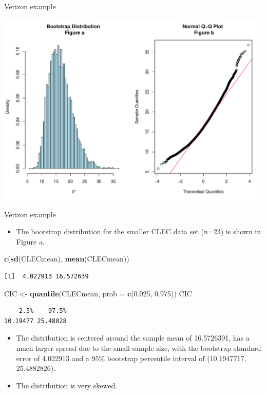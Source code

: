 \documentclass[
  ignorenonframetext,
]{beamer}
\newenvironment{Shaded}{\begin{snugshade}}{\end{snugshade}}
\newcommand{\AttributeTok}[1]{\textcolor[rgb]{0.13,0.29,0.53}{#1}}
\newcommand{\FloatTok}[1]{\textcolor[rgb]{0.00,0.00,0.81}{#1}}
\newcommand{\FunctionTok}[1]{\textcolor[rgb]{0.13,0.29,0.53}{\textbf{#1}}}
\newcommand{\NormalTok}[1]{#1}
\newcommand{\OtherTok}[1]{\textcolor[rgb]{0.56,0.35,0.01}{#1}}
\providecommand{\tightlist}{%
  \setlength{\itemsep}{0pt}\setlength{\parskip}{0pt}}
\begin{document}
\begin{frame}[fragile]{Verizon example}
\begin{center}\includegraphics[width=0.6\linewidth,height=0.35\textheight]{Week10A_files/figure-beamer/unnamed-chunk-35-1} \end{center}
\normalsize
\end{frame}

\begin{frame}[fragile]{Verizon example}
\protect\hypertarget{verizon-example-5}{}
\begin{itemize}
\tightlist
\item
  The bootstrap distribution for the smaller CLEC data set (n=23) is
  shown in Figure a.
\end{itemize}

\small

\begin{Shaded}
\begin{Highlighting}[]
\FunctionTok{c}\NormalTok{(}\FunctionTok{sd}\NormalTok{(CLECmean), }\FunctionTok{mean}\NormalTok{(CLECmean))}
\end{Highlighting}
\end{Shaded}

\begin{verbatim}
[1]  4.022913 16.572639
\end{verbatim}

\begin{Shaded}
\begin{Highlighting}[]
\NormalTok{CIC }\OtherTok{\textless{}{-}} \FunctionTok{quantile}\NormalTok{(CLECmean, }\AttributeTok{prob =} \FunctionTok{c}\NormalTok{(}\FloatTok{0.025}\NormalTok{, }\FloatTok{0.975}\NormalTok{))}
\NormalTok{CIC}
\end{Highlighting}
\end{Shaded}

\begin{verbatim}
    2.5%    97.5% 
10.19477 25.48828 
\end{verbatim}

\normalsize

\begin{itemize}
\tightlist
\item
  The distribution is centered around the sample mean of 16.5726391, has
  a much larger spread due to the small sample size, with the bootstrap
  standard error of 4.022913 and a \(95\%\) bootstrap percentile
  interval of (10.1947717, 25.4882826).
\item
  The distribution is very skewed.
\end{itemize}
\end{frame}
\end{document}
